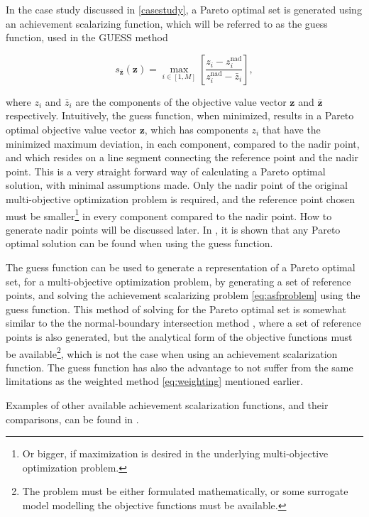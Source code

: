 In the case study discussed in \ref{casestudy}, a Pareto optimal set is generated using an achievement scalarizing function, which will be
referred to as the guess function, used in the
GUESS method \cite{Buchanan1997}

\begin{equation}
    \label{eq:guessasf}
    s_\mathbf{\bar{z}}(\mathbf{z}) = \max_{i \in [1, M]}
    \left[ \frac{z_i - z_i^{\text{nad}}}
    {z_i^{\text{nad}} - \bar{z}_i}
    \right],
\end{equation}

where $z_i$ and $\bar{z}_i$ are the components of the objective value vector $\mathbf{z}$ and $\mathbf{\bar{z}}$ respectively. Intuitively,
the guess function, when minimized, results in a Pareto optimal objective value vector $\mathbf{z}$, which has components $z_i$ that have the minimized maximum
deviation, in each component, compared to the nadir point, and which resides on a line segment connecting the reference point and the nadir point.
This is a very straight forward way of calculating a Pareto optimal solution, with minimal assumptions made. Only the nadir point of the original
multi-objective optimization problem is required, and the reference point chosen must be smaller\footnote{Or bigger, if maximization is desired in the
underlying multi-objective optimization problem.}
in every component compared to the nadir point.
How to generate nadir points will be discussed later. In
\cite[chapter 5.7]{Miettinen1998}, it is shown that any Pareto optimal solution can be found when using the guess function.

The guess function can be used to generate a representation of a Pareto optimal set, for a multi-objective optimization problem, by
generating a set of reference points, and solving the achievement scalarizing problem \eqref{eq:asfproblem} using the guess function.
This method of solving for the Pareto optimal set is somewhat similar to the the normal-boundary intersection method \cite{Das1998},
where a set of reference points is also generated, but the analytical form of the objective functions must be
available\footnote{The problem must be either formulated mathematically, or some  surrogate model modelling the
objective functions must be available.}, which is not the case when using an achievement scalarization function.
The guess function has also the advantage to
not suffer from the same limitations as the weighted method \eqref{eq:weighting} mentioned earlier.

Examples of other available achievement scalarization functions, and their comparisons, can be found in \cite{Miettinen2002}.

